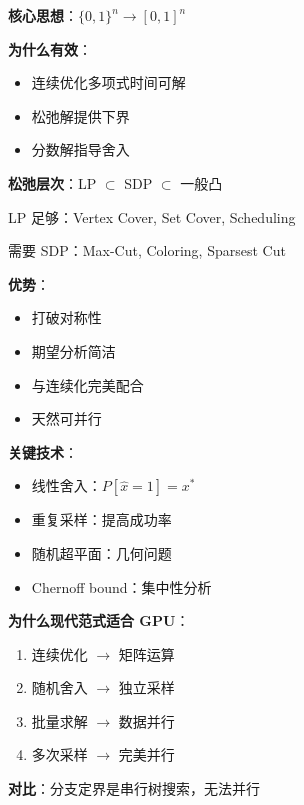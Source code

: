 \documentclass[12pt, a4paper]{ctexart}
\begin{document}
\begin{keypoint}[连续化的威力]

\textbf{核心思想}：$\{0,1\}^n \to [0,1]^n$

\textbf{为什么有效}：
\begin{itemize}
    \item 连续优化多项式时间可解
    \item 松弛解提供下界
    \item 分数解指导舍入
\end{itemize}

\textbf{松弛层次}：LP $\subset$ SDP $\subset$ 一般凸

LP 足够：Vertex Cover, Set Cover, Scheduling

需要 SDP：Max-Cut, Coloring, Sparsest Cut

\end{keypoint}

\begin{keypoint}[随机化的威力]

\textbf{优势}：
\begin{itemize}
    \item 打破对称性
    \item 期望分析简洁
    \item 与连续化完美配合
    \item 天然可并行
\end{itemize}

\textbf{关键技术}：
\begin{itemize}
    \item 线性舍入：$P[\hat{x}=1] = x^*$
    \item 重复采样：提高成功率
    \item 随机超平面：几何问题
    \item Chernoff bound：集中性分析
\end{itemize}

\end{keypoint}

\begin{keypoint}

\textbf{为什么现代范式适合 GPU}：
\begin{enumerate}
    \item 连续优化 $\to$ 矩阵运算
    \item 随机舍入 $\to$ 独立采样
    \item 批量求解 $\to$ 数据并行
    \item 多次采样 $\to$ 完美并行
\end{enumerate}

\textbf{对比}：分支定界是串行树搜索，无法并行

\end{keypoint}
\end{document}
